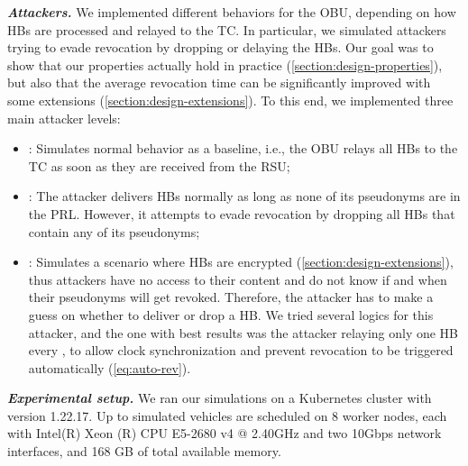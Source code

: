 \noindent\textbf{\emph{Attackers.}}
%
We implemented different behaviors for the \ac{OBU}, depending on how \acp{HB}
are processed and relayed to the \ac{TC}. In particular, we simulated attackers
trying to evade revocation by dropping or delaying the \acp{HB}. Our goal was to
show that our properties actually hold in practice
(\cref{section:design-properties}), but also that the average revocation time
can be significantly improved with some extensions
(\cref{section:design-extensions}). To this end, we implemented three main
attacker levels:
%
\begin{itemize}
    \item \attackerhonest: Simulates normal behavior as a baseline, i.e.,
      the \ac{OBU} relays all \acp{HB} to the \ac{TC} as soon as they are
      received from the \ac{RSU};
    \item \attackersmart: The \attackersmart{} attacker delivers \acp{HB}
      normally as long as none of its pseudonyms are in the \ac{PRL}. However,
      it attempts to evade revocation by dropping all \acp{HB} that contain any
      of its pseudonyms;
    \item \attackerblind{}: Simulates a scenario where \acp{HB} are encrypted
    (\cref{section:design-extensions}), thus attackers have no access to their
    content and do not know if and when their pseudonyms will get revoked.
    Therefore, the \attackerblind{} attacker has to make a guess on whether to
    deliver or drop a \ac{HB}. We tried several logics for this attacker, and
    the one with best results was the attacker relaying only one \ac{HB} every
    \paramtt{}, to allow clock synchronization and prevent revocation to be
    triggered automatically (\cref{eq:auto-rev}).
\end{itemize}

\noindent\textbf{\emph{Experimental setup.}}
%
%
%
We ran our simulations on a Kubernetes \cite{kubernetes} cluster with version
1.22.17. Up to \simvehicles{} simulated vehicles are scheduled on 8 worker
nodes, each with Intel(R) Xeon (R) CPU E5-2680 v4 @ 2.40GHz and two 10Gbps
network interfaces, and 168 GB of total available memory.

